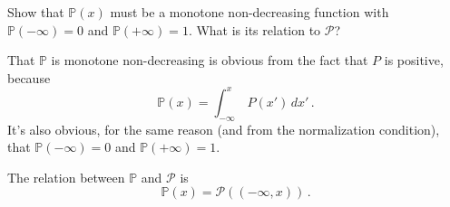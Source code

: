 

Show that $\mathbb{P}(x)$ must be a monotone non-decreasing function with $\mathbb{P}(-\infty) = 0$ and $\mathbb{P}(+\infty) = 1$.
What is its relation to $\mathcal{P}$?


That $\mathbb{P}$ is monotone non-decreasing is obvious from the fact that $P$ is positive, because
\begin{equation*}
\mathbb{P}(x) = \int_{-\infty}^x \, P(x') \, dx' \, .
\end{equation*}
It's also obvious, for the same reason (and from the normalization condition), that $\mathbb{P}(-\infty)=0$ and $\mathbb{P}(+\infty) = 1$.

The relation between $\mathbb{P}$ and $\mathcal{P}$ is
\begin{equation*}
\mathbb{P}(x) = \mathcal{P}((-\infty, x)) \, .
\end{equation*}
